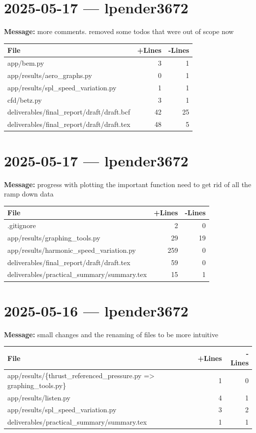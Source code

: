\documentclass{article}
\begin{document}
\section*{2025-05-17 --- lpender3672}
\textbf{Message:} more comments. removed some todos that were out of scope now

\begin{longtable}{|p{10cm}|r|r|}
\hline \textbf{File} & \textbf{+Lines} & \textbf{-Lines} \\
\hline
app/bem.py & 3 & 1 \\
\hline
app/results/aero\_graphs.py & 0 & 1 \\
\hline
app/results/spl\_speed\_variation.py & 1 & 1 \\
\hline
cfd/betz.py & 3 & 1 \\
\hline
deliverables/final\_report/draft/draft.bcf & 42 & 25 \\
\hline
deliverables/final\_report/draft/draft.tex & 48 & 5 \\
\hline
\end{longtable}

\section*{2025-05-17 --- lpender3672}
\textbf{Message:} progress with plotting the important function need to get rid of all the ramp down data

\begin{longtable}{|p{10cm}|r|r|}
\hline \textbf{File} & \textbf{+Lines} & \textbf{-Lines} \\
\hline
.gitignore & 2 & 0 \\
\hline
app/results/graphing\_tools.py & 29 & 19 \\
\hline
app/results/harmonic\_speed\_variation.py & 259 & 0 \\
\hline
deliverables/final\_report/draft/draft.tex & 59 & 0 \\
\hline
deliverables/practical\_summary/summary.tex & 15 & 1 \\
\hline
\end{longtable}

\section*{2025-05-16 --- lpender3672}
\textbf{Message:} small changes and the renaming of files to be more intuitive

\begin{longtable}{|p{10cm}|r|r|}
\hline \textbf{File} & \textbf{+Lines} & \textbf{-Lines} \\
\hline
app/results/\{thrust\_referenced\_pressure.py => graphing\_tools.py\} & 1 & 0 \\
\hline
app/results/listen.py & 4 & 1 \\
\hline
app/results/spl\_speed\_variation.py & 3 & 2 \\
\hline
deliverables/practical\_summary/summary.tex & 1 & 1 \\
\hline
\end{longtable}
\end{document}
